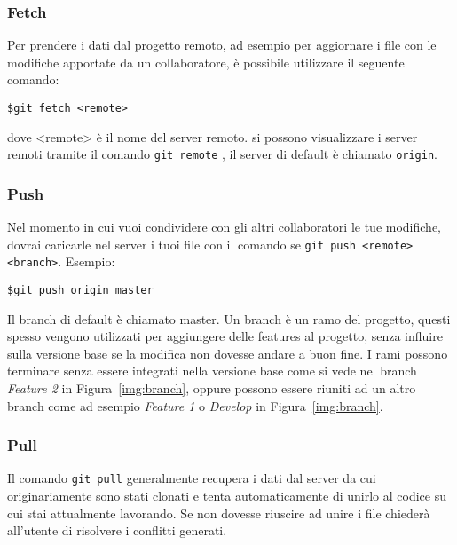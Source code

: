 			\subsubsection*{Fetch}
				Per prendere i dati dal progetto remoto, ad esempio per aggiornare i file con le modifiche apportate da un collaboratore, è possibile utilizzare il seguente comando:
				\begin{tcolorbox}
					\texttt{\$\qquad git fetch <remote>}
				\end{tcolorbox}
				dove <remote> è il nome del server remoto. si possono visualizzare i server remoti tramite il comando \verb|git remote| , il server di default è chiamato \verb|origin|.
			
			
			\subsubsection*{Push}
				Nel momento in cui vuoi condividere con gli altri collaboratori le tue modifiche, dovrai caricarle nel server i tuoi file con il comando se \texttt{git push <remote> <branch>}. Esempio:
				\begin{tcolorbox}
					\texttt{\$\qquad git push origin master}
				\end{tcolorbox}
				Il branch di default è chiamato master. Un branch è un ramo del progetto, questi spesso vengono utilizzati per aggiungere delle features al progetto, senza influire sulla versione base se la modifica non dovesse andare a buon fine. I rami possono terminare senza essere integrati nella versione base come si vede nel branch \textit{Feature 2} in Figura~\ref{img:branch}, oppure possono essere riuniti ad un altro branch come ad esempio \textit{Feature 1} o \textit{Develop} in Figura~\ref{img:branch}.
				
				\begin{center}
					\label{img:branch}
				\end{center}
			
			\subsubsection*{Pull}
				Il comando \verb|git pull| generalmente recupera i dati dal server da cui originariamente sono stati clonati e tenta automaticamente di unirlo al codice su cui stai attualmente lavorando. Se non dovesse riuscire ad unire i file chiederà all'utente di risolvere i conflitti generati.


